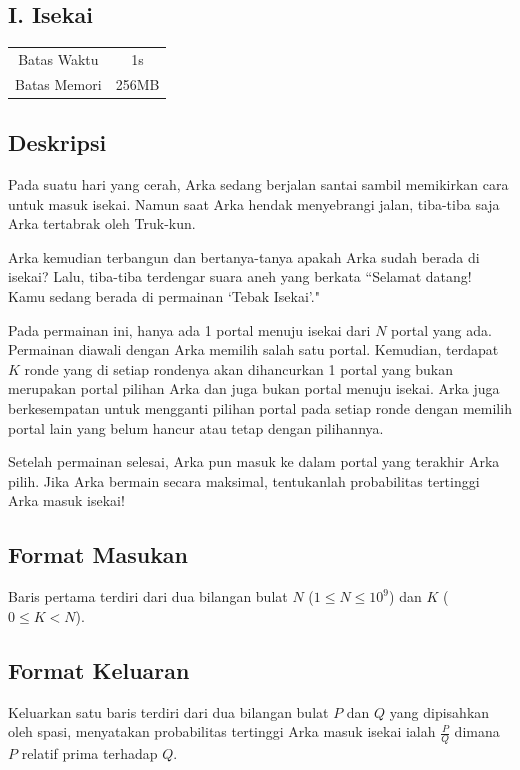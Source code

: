 \documentclass{article}
\begin{document}
\begin{center}
    \section*{I. Isekai} %

    \begin{tabular}{ | c c | }
        \hline
        Batas Waktu  & 1s \\    %
        Batas Memori & 256MB \\  %
        \hline
    \end{tabular}
\end{center}

\subsection*{Deskripsi}
Pada suatu hari yang cerah, Arka sedang berjalan santai sambil memikirkan cara untuk masuk isekai. Namun saat Arka hendak menyebrangi jalan, tiba-tiba saja Arka tertabrak oleh Truk-kun.

Arka kemudian terbangun dan bertanya-tanya apakah Arka sudah berada di isekai? Lalu, tiba-tiba terdengar suara aneh yang berkata “Selamat datang! Kamu sedang berada di permainan ‘Tebak Isekai’." 

Pada permainan ini, hanya ada 1 portal menuju isekai dari $N$ portal yang ada. Permainan diawali dengan Arka memilih salah satu portal. Kemudian, terdapat $K$ ronde yang di setiap rondenya akan dihancurkan 1 portal yang bukan merupakan portal pilihan Arka dan juga bukan portal menuju isekai. Arka juga berkesempatan untuk mengganti pilihan portal pada setiap ronde dengan memilih portal lain yang belum hancur atau tetap dengan pilihannya.

Setelah permainan selesai, Arka pun masuk ke dalam portal yang terakhir Arka pilih. Jika Arka bermain secara maksimal, tentukanlah probabilitas tertinggi Arka masuk isekai!

\subsection*{Format Masukan}
Baris pertama terdiri dari dua bilangan bulat $N$ ($1 \leq N \leq 10^9$) dan $K$ ($0 \leq K < N$).

\subsection*{Format Keluaran}
Keluarkan satu baris terdiri dari dua bilangan bulat $P$ dan $Q$ yang dipisahkan oleh spasi, menyatakan probabilitas tertinggi Arka masuk isekai ialah $\frac{P}{Q}$ dimana $P$ relatif prima terhadap $Q$.
\end{document}
